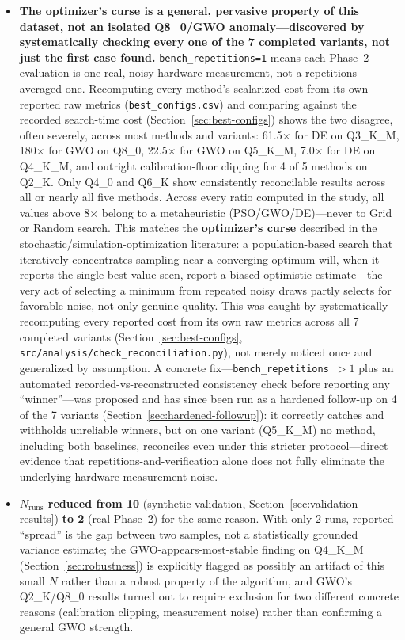 \documentclass[journal]{IEEEtran}
\begin{document}
\begin{itemize}
  \item \textbf{The optimizer's curse is a general, pervasive property of this dataset, not an isolated Q8\_0/GWO anomaly---discovered by systematically checking every one of the 7 completed variants, not just the first case found.} \texttt{bench\_repetitions=1} means each Phase~2 evaluation is one real, noisy hardware measurement, not a repetitions-averaged one. Recomputing every method's scalarized cost from its own reported raw metrics (\texttt{best\_configs.csv}) and comparing against the recorded search-time cost (Section~\ref{sec:best-configs}) shows the two disagree, often severely, across most methods and variants: 61.5$\times$ for DE on Q3\_K\_M, 180$\times$ for GWO on Q8\_0, 22.5$\times$ for GWO on Q5\_K\_M, 7.0$\times$ for DE on Q4\_K\_M, and outright calibration-floor clipping for 4 of 5 methods on Q2\_K. Only Q4\_0 and Q6\_K show consistently reconcilable results across all or nearly all five methods. Across every ratio computed in the study, all values above 8$\times$ belong to a metaheuristic (PSO/GWO/DE)---never to Grid or Random search. This matches the \textbf{optimizer's curse} described in the stochastic/simulation-optimization literature: a population-based search that iteratively concentrates sampling near a converging optimum will, when it reports the single best value seen, report a biased-optimistic estimate---the very act of selecting a minimum from repeated noisy draws partly selects for favorable noise, not only genuine quality. This was caught by systematically recomputing every reported cost from its own raw metrics across all 7 completed variants (Section~\ref{sec:best-configs}, \texttt{src/analysis/check\_reconciliation.py}), not merely noticed once and generalized by assumption. A concrete fix---\texttt{bench\_repetitions}~$>1$ plus an automated recorded-vs-reconstructed consistency check before reporting any ``winner''---was proposed and has since been run as a hardened follow-up on 4 of the 7 variants (Section~\ref{sec:hardened-followup}): it correctly catches and withholds unreliable winners, but on one variant (Q5\_K\_M) no method, including both baselines, reconciles even under this stricter protocol---direct evidence that repetitions-and-verification alone does not fully eliminate the underlying hardware-measurement noise.
  \item \textbf{$N_{\text{runs}}$ reduced from 10} (synthetic validation, Section~\ref{sec:validation-results}) \textbf{to 2} (real Phase~2) for the same reason. With only 2 runs, reported ``spread'' is the gap between two samples, not a statistically grounded variance estimate; the GWO-appears-most-stable finding on Q4\_K\_M (Section~\ref{sec:robustness}) is explicitly flagged as possibly an artifact of this small $N$ rather than a robust property of the algorithm, and GWO's Q2\_K/Q8\_0 results turned out to require exclusion for two different concrete reasons (calibration clipping, measurement noise) rather than confirming a general GWO strength.

\end{itemize}
\end{document}
